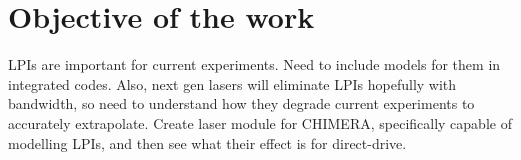 \section{Objective of the work}%
\label{sec:intro_objective}

LPIs are important for current experiments.
Need to include models for them in integrated codes.
Also, next gen lasers will eliminate LPIs hopefully with bandwidth, so need to understand how they degrade current experiments to accurately extrapolate.
Create laser module for CHIMERA, specifically capable of modelling LPIs, and then see what their effect is for direct-drive.
